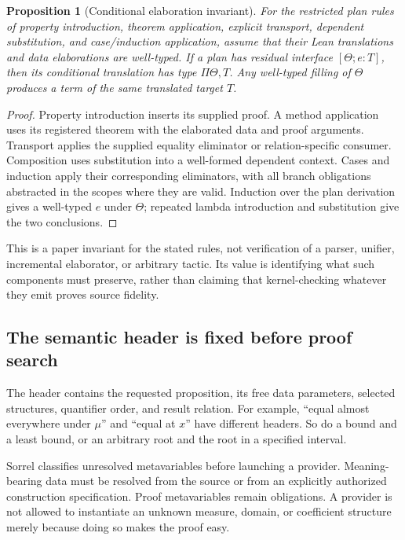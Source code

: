 \documentclass[11pt,a4paper]{article}
\numberwithin{equation}{section}
\newtheorem{proposition}[theorem]{Proposition}
\theoremstyle{definition}\newtheorem{definition}[theorem]{Definition}
\theoremstyle{remark}\newtheorem{remark}[theorem]{Remark}
\begin{document}
\begin{proposition}[Conditional elaboration invariant]\label{prop:preservation}
For the restricted plan rules of property introduction, theorem application,
explicit transport, dependent substitution, and case/induction application,
assume that their Lean translations and data elaborations are well-typed.
If a plan has residual interface \([\Theta;e:T]\), then its conditional
translation has type \(\Pi\Theta,T\). Any well-typed filling of \(\Theta\)
produces a term of the same translated target \(T\).
\end{proposition}
\begin{proof}
Property introduction inserts its supplied proof. A method application uses
its registered theorem with the elaborated data and proof arguments.
Transport applies the supplied equality eliminator or relation-specific
consumer. Composition uses substitution into a well-formed dependent
context. Cases and induction apply their corresponding eliminators, with
all branch obligations abstracted in the scopes where they are valid.
Induction over the plan derivation gives a well-typed \(e\) under \(\Theta\);
repeated lambda introduction and substitution give the two conclusions.
\end{proof}

This is a paper invariant for the stated rules, not verification of a parser,
unifier, incremental elaborator, or arbitrary tactic. Its value is identifying
what such components must preserve, rather than claiming that kernel-checking
whatever they emit proves source fidelity.

\subsection{The semantic header is fixed before proof search}
The header contains the requested proposition, its free data parameters,
selected structures, quantifier order, and result relation. For example,
``equal almost everywhere under \(\mu\)'' and ``equal at \(x\)'' have different
headers. So do a bound and a least bound, or an arbitrary root and the root in
a specified interval.

Sorrel classifies unresolved metavariables before launching a provider.
Meaning-bearing data must be resolved from the source or from an explicitly
authorized construction specification. Proof metavariables remain obligations.
A provider is not allowed to instantiate an unknown measure, domain, or
coefficient structure merely because doing so makes the proof easy.
\end{document}
